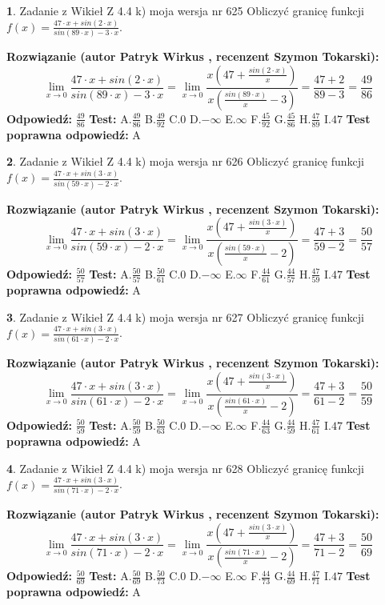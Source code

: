 \documentclass[12pt, a4paper]{article}
\theoremstyle{definition} %
\newtheorem{zad}{}
\newcommand{\zadStart}[1]{\begin{zad}#1\newline}
\newcommand{\zadStop}{\end{zad}}
\newcommand{\rozwStart}[2]{\noindent \textbf{Rozwiązanie (autor #1 , recenzent #2): }\newline}
\newcommand{\rozwStop}{\newline}
\newcommand{\odpStart}{\noindent \textbf{Odpowiedź:}\newline}
\newcommand{\odpStop}{\newline}
\newcommand{\testStart}{\noindent \textbf{Test:}\newline}
\newcommand{\testStop}{\newline}
\newcommand{\kluczStart}{\noindent \textbf{Test poprawna odpowiedź:}\newline}
\newcommand{\kluczStop}{\newline}
\begin{document}
\zadStart{Zadanie z Wikieł Z 4.4 k) moja wersja nr 625}
Obliczyć granicę funkcji $f(x)=\frac{47\cdot x +sin(2\cdot x)}{sin(89\cdot x) -3\cdot x}$.
\zadStop
\rozwStart{Patryk Wirkus}{Szymon Tokarski}
$$\lim\limits_{x\to 0}\frac{47\cdot x +sin(2\cdot x)}{sin(89\cdot x) -3\cdot x}
=\lim\limits_{x\to 0}\frac{x(47+\frac{sin(2\cdot x)}{x})}{x(\frac{sin(89\cdot x)}{x}-3)}
=\frac{47+2}{89-3} = \frac{49}{86}$$
\rozwStop
\odpStart
$\frac{49}{86}$
\odpStop
\testStart
A.$\frac{49}{86}$
B.$\frac{49}{92}$
C.$0$
D.$-\infty$
E.$\infty$
F.$\frac{45}{92}$
G.$\frac{45}{86}$
H.$\frac{47}{89}$
I.$47$
\testStop
\kluczStart
A
\kluczStop



\zadStart{Zadanie z Wikieł Z 4.4 k) moja wersja nr 626}
Obliczyć granicę funkcji $f(x)=\frac{47\cdot x +sin(3\cdot x)}{sin(59\cdot x) -2\cdot x}$.
\zadStop
\rozwStart{Patryk Wirkus}{Szymon Tokarski}
$$\lim\limits_{x\to 0}\frac{47\cdot x +sin(3\cdot x)}{sin(59\cdot x) -2\cdot x}
=\lim\limits_{x\to 0}\frac{x(47+\frac{sin(3\cdot x)}{x})}{x(\frac{sin(59\cdot x)}{x}-2)}
=\frac{47+3}{59-2} = \frac{50}{57}$$
\rozwStop
\odpStart
$\frac{50}{57}$
\odpStop
\testStart
A.$\frac{50}{57}$
B.$\frac{50}{61}$
C.$0$
D.$-\infty$
E.$\infty$
F.$\frac{44}{61}$
G.$\frac{44}{57}$
H.$\frac{47}{59}$
I.$47$
\testStop
\kluczStart
A
\kluczStop



\zadStart{Zadanie z Wikieł Z 4.4 k) moja wersja nr 627}
Obliczyć granicę funkcji $f(x)=\frac{47\cdot x +sin(3\cdot x)}{sin(61\cdot x) -2\cdot x}$.
\zadStop
\rozwStart{Patryk Wirkus}{Szymon Tokarski}
$$\lim\limits_{x\to 0}\frac{47\cdot x +sin(3\cdot x)}{sin(61\cdot x) -2\cdot x}
=\lim\limits_{x\to 0}\frac{x(47+\frac{sin(3\cdot x)}{x})}{x(\frac{sin(61\cdot x)}{x}-2)}
=\frac{47+3}{61-2} = \frac{50}{59}$$
\rozwStop
\odpStart
$\frac{50}{59}$
\odpStop
\testStart
A.$\frac{50}{59}$
B.$\frac{50}{63}$
C.$0$
D.$-\infty$
E.$\infty$
F.$\frac{44}{63}$
G.$\frac{44}{59}$
H.$\frac{47}{61}$
I.$47$
\testStop
\kluczStart
A
\kluczStop



\zadStart{Zadanie z Wikieł Z 4.4 k) moja wersja nr 628}
Obliczyć granicę funkcji $f(x)=\frac{47\cdot x +sin(3\cdot x)}{sin(71\cdot x) -2\cdot x}$.
\zadStop
\rozwStart{Patryk Wirkus}{Szymon Tokarski}
$$\lim\limits_{x\to 0}\frac{47\cdot x +sin(3\cdot x)}{sin(71\cdot x) -2\cdot x}
=\lim\limits_{x\to 0}\frac{x(47+\frac{sin(3\cdot x)}{x})}{x(\frac{sin(71\cdot x)}{x}-2)}
=\frac{47+3}{71-2} = \frac{50}{69}$$
\rozwStop
\odpStart
$\frac{50}{69}$
\odpStop
\testStart
A.$\frac{50}{69}$
B.$\frac{50}{73}$
C.$0$
D.$-\infty$
E.$\infty$
F.$\frac{44}{73}$
G.$\frac{44}{69}$
H.$\frac{47}{71}$
I.$47$
\testStop
\kluczStart
A
\kluczStop
\end{document}
